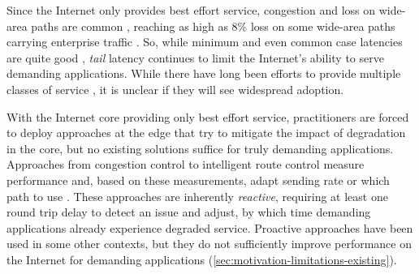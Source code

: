 \documentclass[sigconf,nonacm,screen,letterpaper,10pt]{acmart}
\begin{document}
Since the Internet only provides best effort service, congestion and
loss on wide-area paths are common
\cite{akella-congestion, dhamdhere2018inferring}, reaching as high as
8\% loss on some wide-area paths carrying enterprise traffic
\cite{silverpeak-loss-info}. So, while minimum and even common case
latencies are quite good
\cite{whyhigh, calder2015analyzing, latency-shears, tom-anycast, brandon-facebook-imc},
\emph{tail} latency continues to limit the Internet's ability to serve
demanding applications. While there have long been efforts to provide
multiple classes of service \cite{diffserv-rfc, intserv-rfc, l4s-rfc},
it is unclear if they will see widespread adoption.

With the Internet core providing only best effort service, practitioners
are forced to deploy approaches at the edge that try to mitigate the
impact of degradation in the core, but no existing solutions suffice for
truly demanding applications. Approaches from congestion control to
intelligent route control measure performance and, based on these
measurements, adapt sending rate or which path to use
\cite{calder2015analyzing, painter, anyopt, espresso, edge-fabric, fastly-egress}.
These approaches are inherently \emph{reactive}, requiring at least one
round trip delay to detect an issue and adjust, by which time demanding
applications already experience degraded service. Proactive approaches
have been used in some other contexts, but they do not sufficiently
improve performance on the Internet for demanding applications
(\cref{sec:motivation-limitations-existing}).
\end{document}
